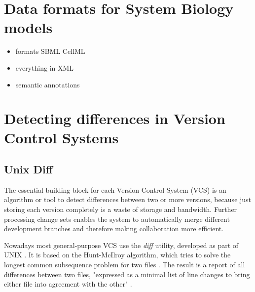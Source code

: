 \section{Data formats for System Biology models}
	\label{sec:background:formats}
	\begin{itemize}
		\item formats
		\subitem SBML
		\subitem CellML
		\subitem \sedml
		\item everything in XML
		\item semantic annotations
	\end{itemize}

\section{Detecting differences in Version Control Systems}
	\label{sec:background:diff}
	
	\subsection{Unix Diff}
	\label{sec:background:diff:unix-diff}
	The essential building block for each Version Control System (VCS) is an algorithm or tool to detect differences between two or more versions, because just storing each version completely is a waste of storage and bandwidth. Further processing change sets enables the system to automatically merge different development branches and therefore making collaboration more efficient.
	
	Nowadays most general-purpose VCS use the \emph{diff} utility, developed as part of UNIX \citep{Chacon2014,OSullivan2009,Collins-Sussman2004}. It is based on the Hunt-McIlroy algorithm, which tries to solve the longest common subsequence problem for two files \citep{Hunt1976}.
	The result is a report of all differences between two files, "expressed as a minimal list of line changes to bring either file into agreement with the other" \citep{Hunt1976}.
	
	\begin{comment}
	\begin{itemize}
		\item Based on solving the longest common subsequence problem
		\item "The program diff reports differences between two files, expressed as a minimal list of line changes to bring either file into agreement with the other" \citep{Hunt1976}
		\item "The central algorithm of diff solves the ‘longest common subsequence problem’ to find the lines that do not change between files" \citep{Hunt1976}
	\end{itemize}
	\end{comment}
	
